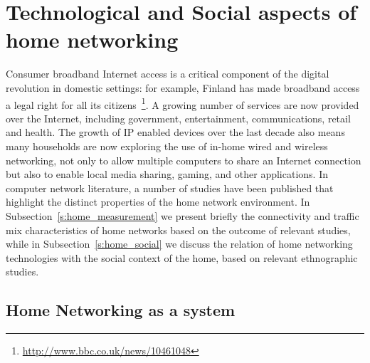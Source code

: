 

\section{Technological and Social aspects of home networking} \label{s:elephant}

Consumer broadband Internet access is a critical component of the digital
revolution in domestic settings: for example, Finland has made broadband access
a legal right for all its
citizens~\footnote{\url{http://www.bbc.co.uk/news/10461048}}. A growing number
of services are now provided over the Internet, including government,
entertainment, communications, retail and health.  The growth of IP enabled
devices over the last decade also means many households are now exploring the
use of in-home wired and wireless networking, not only to allow multiple
computers to share an Internet connection but also to enable local media
sharing, gaming, and other applications.  In computer network literature, a
number of studies have been published that highlight the distinct properties of
the home network environment. In Subsection~\ref{s:home_measurement} we present
briefly the connectivity and traffic mix characteristics of home networks
based on the outcome of relevant studies, while in Subsection~\ref{s:home_social}
we discuss the relation of home networking technologies with the social context 
of the home, based on relevant ethnographic studies. 



\subsection{Home Networking as a system}

